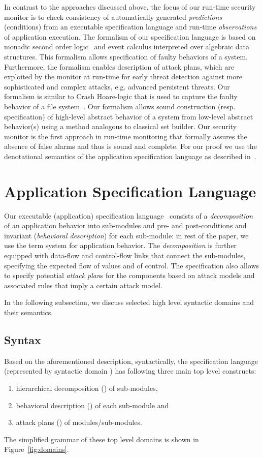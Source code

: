 \documentclass[conference]{IEEEtran}
\begin{document}
In contrast to the approaches discussed above, the focus of our run-time security monitor is to check consistency of automatically generated \emph{predictions} (conditions) from an executable specification language and run-time \emph{observations} of application execution. The formalism of our specification language is based on monadic second order logic~\cite{Henriksen:1995} and event calculus interpreted over algebraic data structures. This formalism allows specification of faulty behaviors of a system. Furthermore, the formalism enables description of attack plans, which are exploited by the monitor at run-time for early threat detection against more sophisticated and complex attacks, e.g. advanced persistent threats. Our formalism is similar to Crash Hoare-logic that is used to capture the faulty behavior of a file system~\cite{Chen:2015}. Our formalism allows sound construction (resp. specification) of high-level abstract behavior of a system from low-level abstract behavior(s) using a method analogous to classical set builder. Our security monitor is the first approach in run-time monitoring that formally assures the absence of false alarms and thus is sound and complete. For our proof we use the denotational semantics of the application specification language as described in~\cite{MTK:2015a}.



\section{Application Specification Language}\label{sec:lang}
Our executable (application) specification language~\cite{Shrobe:2006} consists of a \emph{decomposition} of an application behavior into sub-modules and pre- and post-conditions and invariant (\emph{behavioral description}) for each sub-module: in rest of the paper, we use the term system for application behavior. The \emph{decomposition} is further equipped with data-flow and control-flow links that connect the sub-modules, specifying the expected flow of values and of control. The specification also allows to specify potential \emph{attack plan}s for the components based on attack models and associated rules that imply a certain attack model.

In the following subsection, we discuss selected high level syntactic domains and their semantics. 
\subsection{Syntax}\label{subsec:sam-syntax}
Based on the aforementioned description, syntactically, the specification language (represented by syntactic domain ) has following three main top level constructs:
\begin{enumerate}
\item hierarchical decomposition () of sub-modules,
\item behavioral description () of each sub-module and
\item attack plans () of modules/sub-modules.
\end{enumerate}
The simplified grammar of these top level domains is shown in Figure~\ref{fig:domains}.
\end{document}
